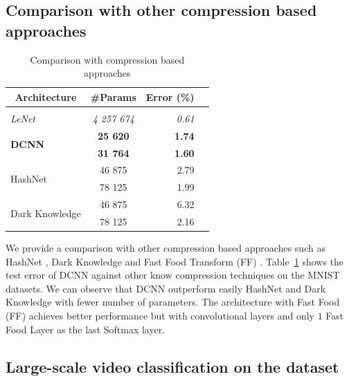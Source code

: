 \subsection{Comparison with other compression based approaches}
\label{subsection:ch4-comparison_with_other_compression_based_approaches}


\begin{table}
  \centering
    \caption{Comparison with compression based approaches}
    \begin{tabular}{lcrc}
    \toprule
    \multicolumn{1}{c}{\textbf{Architecture}} & \multicolumn{1}{c}{\textbf{\#Params}} & \textbf{Error (\%)} \\
    \hline \\
    \textit{LeNet \cite{Lecun98gradient-basedlearning}} & \textit{4 257 674} & \textit{0.61} \\
    \multirow{2}[0]{*}{\textbf{DCNN}} & \textbf{25 620} & \textbf{1.74} \\
          & \textbf{31 764} & \textbf{1.60} \\
    \multirow{2}[0]{*}{HashNet \cite{Chen_Hashing_Trick}} & 46 875 & 2.79 \\
          &  78 125 & 1.99 \\
    \multirow{2}[0]{*}{Dark Knowledge \cite{44873}} & 46 875 & 6.32 \\
          &  78 125 & 2.16 \\
    \bottomrule
    \end{tabular}%
  \label{tab:mnist}%
\end{table}%


We provide a comparison with other compression based approaches such as HashNet \cite{Chen_Hashing_Trick}, Dark Knowledge \cite{44873} and Fast Food Transform (FF) \cite{7410530}. 
Table~\ref{tab:mnist} shows the test error of DCNN against other know compression techniques on the MNIST datasets. We can observe that DCNN outperform easily HashNet \cite{Chen_Hashing_Trick} and Dark Knowledge \cite{44873} with fewer number of parameters. The architecture with Fast Food (FF) \cite{7410530} achieves better performance but with convolutional layers and only $1$ Fast Food Layer as the last Softmax layer. 


\subsection{Large-scale video classification on the \yt dataset}
\label{subsection:ch4-large_scale_video_classification}

